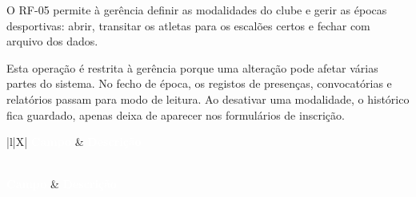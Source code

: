 O RF-05 permite à gerência definir as modalidades do clube e gerir as épocas desportivas: abrir, transitar os atletas para os escalões certos e fechar com arquivo dos dados.

Esta operação é restrita à gerência porque uma alteração pode afetar várias partes do sistema. No fecho de época, os registos de presenças, convocatórias e relatórios passam para modo de leitura. Ao desativar uma modalidade, o histórico fica guardado, apenas deixa de aparecer nos formulários de inscrição.

{\small
{}
\begin{xltabular}{\textwidth}{|l|X|}
\hline
{}\textcolor{white}{\textbf{Campo}} & \textcolor{white}{\textbf{Descrição}} \\ \hline
\endfirsthead

 \\
\hline
{}\textcolor{white}{\textbf{Campo}} & \textcolor{white}{\textbf{Descrição}} \\ \hline
\endhead

\hline {} \\ \hline \endfoot

\hline
\caption{Especificação do Requisito Funcional: RF-05}
\label{tab:rf-05} \\
\endlastfoot


\end{xltabular}}
